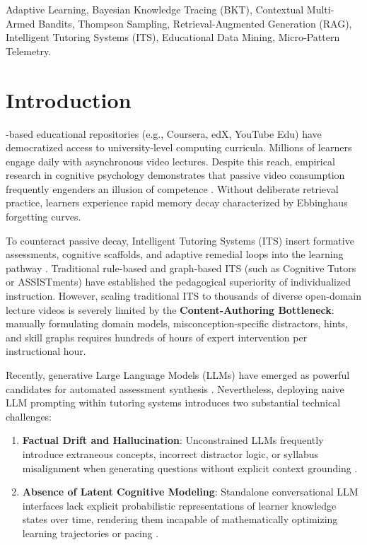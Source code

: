 \documentclass[journal]{IEEEtran}
\begin{document}
%
%
\begin{IEEEkeywords}
Adaptive Learning, Bayesian Knowledge Tracing (BKT), Contextual Multi-Armed Bandits, Thompson Sampling, Retrieval-Augmented Generation (RAG), Intelligent Tutoring Systems (ITS), Educational Data Mining, Micro-Pattern Telemetry.
\end{IEEEkeywords}

\IEEEpeerreviewmaketitle

%
%
\section{Introduction}
-based educational repositories (e.g., Coursera, edX, YouTube Edu) have democratized access to university-level computing curricula. Millions of learners engage daily with asynchronous video lectures. Despite this reach, empirical research in cognitive psychology demonstrates that passive video consumption frequently engenders an illusion of competence \cite{dunlosky2013improving, karpicke2008critical}. Without deliberate retrieval practice, learners experience rapid memory decay characterized by Ebbinghaus forgetting curves.

To counteract passive decay, Intelligent Tutoring Systems (ITS) insert formative assessments, cognitive scaffolds, and adaptive remedial loops into the learning pathway \cite{koedinger1997intelligent, bloom19842, vanlehn2006behavior}. Traditional rule-based and graph-based ITS (such as Cognitive Tutors or ASSISTments) have established the pedagogical superiority of individualized instruction. However, scaling traditional ITS to thousands of diverse open-domain lecture videos is severely limited by the \textbf{Content-Authoring Bottleneck}: manually formulating domain models, misconception-specific distractors, hints, and skill graphs requires hundreds of hours of expert intervention per instructional hour.

Recently, generative Large Language Models (LLMs) have emerged as powerful candidates for automated assessment synthesis \cite{scarlatos2024distractor, dan2023educhat, pardos2023chatgpt}. Nevertheless, deploying naive LLM prompting within tutoring systems introduces two substantial technical challenges:
\begin{enumerate}
    \item \textbf{Factual Drift and Hallucination}: Unconstrained LLMs frequently introduce extraneous concepts, incorrect distractor logic, or syllabus misalignment when generating questions without explicit context grounding \cite{gao2023retrieval, lau2024evaluating}.
    \item \textbf{Absence of Latent Cognitive Modeling}: Standalone conversational LLM interfaces lack explicit probabilistic representations of learner knowledge states over time, rendering them incapable of mathematically optimizing learning trajectories or pacing \cite{piech2015deep, pelanek2017bayesian, doroudi2019where}.
\end{enumerate}
\end{document}
